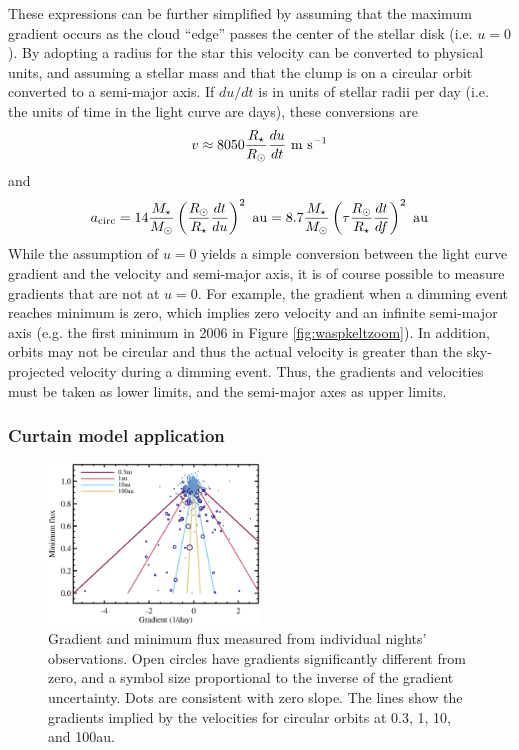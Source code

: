 \documentclass[]{rsos}
\begin{document}
These expressions can be further simplified by assuming that the maximum gradient occurs
as the cloud ``edge'' passes the center of the stellar disk (i.e. $u=0$). By adopting a
radius for the star this velocity can be converted to physical units, and assuming a
stellar mass and that the clump is on a circular orbit converted to a semi-major axis. If
$du/dt$ is in units of stellar radii per day (i.e. the units of time in the light curve
are days), these conversions are
\begin{equation}\label{eq:vcl}
  v \approx  8050 \frac{R_\star}{R_\odot} \frac{du}{dt} ~ {\rm m~s}^{-1}
\end{equation}
and
\begin{equation}\label{eq:acl}
  a_{\rm circ} %
  = 14 \frac{M_\star}{M_\odot} \left( \frac{R_\odot}{R_\star} \frac{dt}{du} \right)^2 ~
  {\rm au}
  = 8.7 \frac{M_\star}{M_\odot} \left( \tau \frac{R_\odot}{R_\star} \frac{dt}{df} \right)^2 ~
  {\rm au}
\end{equation}
While the assumption of $u=0$ yields a simple conversion between the light curve gradient
and the velocity and semi-major axis, it is of course possible to measure gradients that
are not at $u=0$. For example, the gradient when a dimming event reaches minimum is zero,
which implies zero velocity and an infinite semi-major axis (e.g. the first minimum in
2006 in Figure \ref{fig:waspkeltzoom}). In addition, orbits may not be circular and thus
the actual velocity is greater than the sky-projected velocity during a dimming
event. Thus, the gradients and velocities must be taken as lower limits, and the
semi-major axes as upper limits.

\subsubsection{Curtain model application}\label{sss:gradapp}

\begin{figure}
  \begin{center}
    \hspace{-0.5cm} \includegraphics[width=0.5\textwidth]{figs/gradients.eps}
    \caption{Gradient and minimum flux measured from individual nights'
      observations. Open circles have gradients significantly different from zero, and a
      symbol size proportional to the inverse of the gradient uncertainty. Dots are
      consistent with zero slope. The lines show the gradients implied by the velocities
      for circular orbits at 0.3, 1, 10, and 100au.}\label{fig:grad}
  \end{center}
\end{figure}
\end{document}
